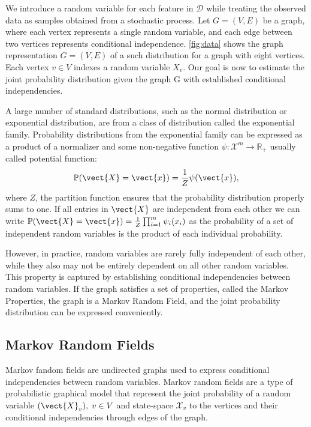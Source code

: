 

We introduce a random variable for each feature in $\mathcal{D}$ while treating the observed data as samples obtained from a stochastic process.
Let $G=(V,E)$ be a graph, where each vertex represents a single random variable, and each edge between two vertices represents conditional independence. 
 \autoref{fig:data} shows the graph representation $G=(V,E)$ of a such distribution for a graph with eight vertices. 
Each vertex $ v \in V$ indexes a random variable $X_v$.
Our goal is now to estimate the joint probability distribution given the graph G with established conditional independencies.



A large number of standard distributions, such as the normal distribution or exponential distribution, are from a class of distribution called the exponential family.
Probability distributions from the exponential family can be expressed as a product of a normalizer and some non-negative function $\psi: \mathcal{X}^m \rightarrow \mathbb{R}_+$ usually called potential function:
\begin{equation}
    \label{eq:probpot}
    \mathbb{P}(\vect{X} = \vect{x}) = \frac{1}{Z} \psi(\vect{x}),
\end{equation}
where $Z$, the partition function ensures that the probability distribution properly sums to one.
If all entries in $\vect{X}$ are independent from each other we can write $\mathbb{P}(\vect{X} = \vect{x}) = \frac{1}{Z} \prod_{i=1}^m \psi_i(x_i)$ as the probability of a set of independent random variables is the product of each individual probability.


However, in practice, random variables are rarely fully independent of each other, while they also may not be entirely dependent on all other random variables.
This property is captured by establishing conditional independencies between random variables.
If the graph satisfies a set of properties, called the Markov Properties, the graph is a Markov Random Field, and the joint probability distribution can be expressed conveniently.

\subsection{Markov Random Fields}
Markov fandom fields are undirected graphs used to express conditional independencies between random variables. 
Markov random fields are a type of probabilistic graphical model that represent the joint probability of a random variable $(\vect{X}_v), \; v \in V$ and state-space $\mathcal{X}_v$ \wrt to the vertices and their conditional independencies through edges of the graph. 

